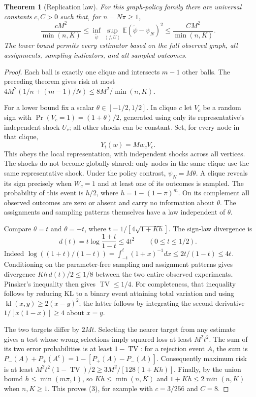 \documentclass[11pt]{article}
\newtheorem{theorem}{Theorem}
\theoremstyle{remark}
\newcommand{\E}{\mathbb E}
\newcommand{\TV}{\operatorname{TV}}
\begin{document}
\begin{theorem}[Replication law]
For this graph-policy family there are universal constants $c,C>0$ such
that, for $n=N\pi\geq1$,
\[
 \frac{cM^2}{\min(n,K)}\leq
 \inf_{\widetilde\psi}\sup_{(f,U)}
       \E(\widetilde\psi-\psi_N)^2
 \leq\frac{CM^2}{\min(n,K)}. \tag{3}
\]
The lower bound permits every estimator based on the full observed graph,
all assignments, sampling indicators, and all sampled outcomes.
\end{theorem}
\begin{proof}
Each ball is exactly one clique and intersects $m-1$ other balls.
The preceding theorem gives risk at most
$4M^2(1/n+(m-1)/N)\leq8M^2/\min(n,K)$.

For a lower bound fix a scalar $\theta\in[-1/2,1/2]$. In clique $c$
let $V_c$ be a random sign with $\Pr(V_c=1)=(1+\theta)/2$, generated
using only its representative's independent shock $U_c$; all other shocks
can be constant. Set, for every node in that clique,
\[
 Y_i(w)=M w_c V_c.
\]
This obeys the local representation, with independent shocks across all
vertices. The shocks do not become globally shared: only nodes in the
same clique use the same representative shock. Under the policy contrast,
$\psi_N=M\theta$. A clique reveals its sign precisely when $W_c=1$
and at least one of its outcomes is sampled. The probability of this event
is $h/2$, where $h=1-(1-\pi)^m$. On its complement all observed outcomes
are zero or absent and carry no information about $\theta$. The assignments
and sampling patterns themselves have a law independent of $\theta$.

Compare $\theta=t$ and $\theta=-t$, where
$t=1/[4\sqrt{1+Kh}]$. The sign-law divergence is
\[
 d(t)=t\log\frac{1+t}{1-t}\leq4t^2\qquad(0\leq t\leq1/2).
\]
Indeed $\log((1+t)/(1-t))=\int_{-t}^t(1+x)^{-1}dx
\leq2t/(1-t)\leq4t$. Conditioning on the parameter-free sampling and
assignment patterns gives divergence $Kh\,d(t)/2\leq1/8$ between
the two entire observed experiments. Pinsker's inequality then gives
$\TV\leq1/4$. For completeness, that inequality follows by reducing KL
to a binary event attaining total variation and using
$\operatorname{kl}(x,y)\geq2(x-y)^2$; the latter follows by integrating
the second derivative $1/[x(1-x)]\geq4$ about $x=y$.

The two targets differ by $2Mt$. Selecting the nearer target from any
estimate gives a test whose wrong selections imply squared loss at least
$M^2t^2$. The sum of its two error probabilities is at least $1-\TV$:
for a rejection event $A$, the sum is $P_-(A)+P_+(A^c)
=1-[P_+(A)-P_-(A)]$. Consequently maximum risk is at least
$M^2t^2(1-\TV)/2\geq3M^2/[128(1+Kh)]$.
Finally, by the union bound $h\leq\min(m\pi,1)$, so
$Kh\leq\min(n,K)$ and $1+Kh\leq2\min(n,K)$ when $n,K\geq1$.
This proves (3), for example with $c=3/256$ and $C=8$.
\end{proof}
\end{document}
